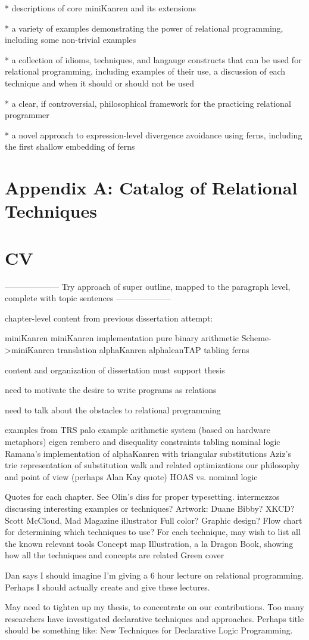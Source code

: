 * descriptions of core miniKanren and its extensions

* a variety of examples demonstrating the power of relational
programming, including some non-trivial examples

* a collection of idioms, techniques, and langauge constructs that can
be used for relational programming, including examples of their use, a
discussion of each technique and when it should or should not be used

* a clear, if controversial, philosophical framework for the
practicing relational programmer

* a novel approach to expression-level divergence avoidance using
ferns, including the first shallow embedding of ferns

\chapter{Appendix A: Catalog of Relational Techniques}

\chapter{CV}


--------------------
Try approach of super outline, mapped to the paragraph level, complete
with topic sentences
--------------------

chapter-level content from previous dissertation attempt:

miniKanren
miniKanren implementation
pure binary arithmetic
Scheme->miniKanren translation
alphaKanren
alphaleanTAP
tabling
ferns

content and organization of dissertation must support thesis

need to motivate the desire to write programs as relations

need to talk about the obstacles to relational programming

examples from TRS
palo example
arithmetic system (based on hardware metaphors)
eigen
rembero and disequality constraints
tabling
nominal logic
Ramana's implementation of alphaKanren with triangular substitutions
Aziz's trie representation of substitution
walk and related optimizations
our philosophy and point of view (perhaps Alan Kay quote)
HOAS vs. nominal logic

Quotes for each chapter.  See Olin's diss for proper typesetting.
intermezzos discussing interesting examples or techniques?
Artwork:  Duane Bibby?  XKCD?  Scott McCloud, Mad Magazine illustrator
Full color?
Graphic design?
Flow chart for determining which techniques to use?
For each technique, may wish to list all the known relevant tools
Concept map
Illustration, a la Dragon Book, showing how all the techniques and
concepts are related
Green cover

Dan says I should imagine I'm giving a 6 hour lecture on relational
programming.  Perhaps I should actually create and give these
lectures.

May need to tighten up my thesis, to concentrate on our contributions.
Too many researchers have investigated declarative techniques and
approaches.  Perhaps title should be something like: New Techniques
for Declarative Logic Programming.
